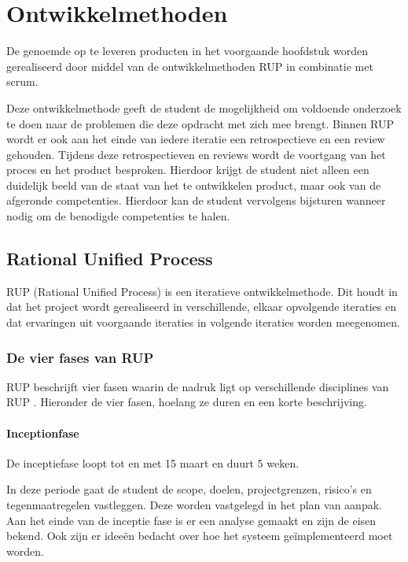 \documentclass[a4paper, 11pt, oneside]{report}
\begin{document}
\chapter{Ontwikkelmethoden}
\label{chapter:ontwikkelmethode}
De genoemde op te leveren producten in het voorgaande hoofdstuk worden gerealiseerd door middel van de ontwikkelmethoden RUP in combinatie met scrum.

Deze ontwikkelmethode geeft de student de mogelijkheid om voldoende onderzoek te doen naar de problemen die deze opdracht met zich mee brengt. 
Binnen RUP wordt er ook aan het einde van iedere iteratie een retrospectieve en een review gehouden. Tijdens deze retrospectieven en reviews wordt de voortgang van het proces en het product besproken. Hierdoor krijgt de student niet alleen een duidelijk beeld van de staat van het te ontwikkelen product, maar ook van de afgeronde competenties. Hierdoor kan de student vervolgens bijsturen wanneer nodig om de benodigde competenties te halen.

\section{Rational Unified Process} 

RUP (Rational Unified Process) is een iteratieve ontwikkelmethode. Dit houdt in dat het project
wordt gerealiseerd in verschillende, elkaar opvolgende iteraties en dat ervaringen uit voorgaande iteraties in volgende iteraties worden meegenomen.\cite{RUP}

\subsection{De vier fases van RUP}
\label{sec:fasesRUP}
RUP beschrijft vier fasen waarin de nadruk ligt op verschillende disciplines van RUP \cite{RUPwim}.
Hieronder de vier fasen, hoelang ze duren en een korte beschrijving.

\subsubsection{Inceptionfase}
\label{sec:inceptionfase}
De inceptiefase loopt tot en met 15 maart en duurt 5 weken.

In deze periode gaat de student de scope, doelen, projectgrenzen, risico's en tegenmaatregelen vastleggen.
Deze worden vastgelegd in het plan van aanpak.
Aan het einde van de inceptie fase is er een analyse gemaakt en zijn de eisen bekend.
Ook zijn er ideeën bedacht over hoe het systeem geïmplementeerd moet worden.
\end{document}

